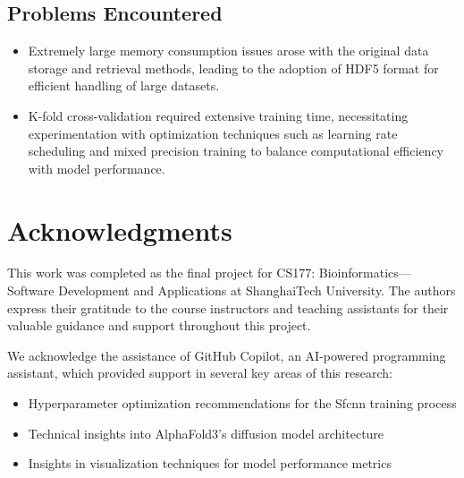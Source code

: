 \documentclass[unnumsec,webpdf,contemporary,large]{oup-authoring-template}
\theoremstyle{thmstyleone}%
\theoremstyle{thmstyletwo}%
\theoremstyle{thmstylethree}%
\begin{document}
\subsection{Problems Encountered}
\begin{itemize}
    \item Extremely large memory consumption issues arose with the original data storage and retrieval methods, leading to the adoption of HDF5 format for efficient handling of large datasets.
    \item K-fold cross-validation required extensive training time, necessitating experimentation with optimization techniques such as learning rate scheduling and mixed precision training to balance computational efficiency with model performance.
\end{itemize}


\section{Acknowledgments}
This work was completed as the final project for CS177: Bioinformatics—Software Development 
and Applications at ShanghaiTech University. 
The authors express their gratitude to the course instructors and teaching assistants 
for their valuable guidance and support throughout this project.

We acknowledge the assistance of GitHub Copilot, an AI-powered programming assistant, 
which provided support in several key areas of this research:
\begin{itemize}
    \item Hyperparameter optimization recommendations for the Sfcnn training process
    \item Technical insights into AlphaFold3's diffusion model architecture
    \item Insights in visualization techniques for model performance metrics
\end{itemize}



\end{document}
